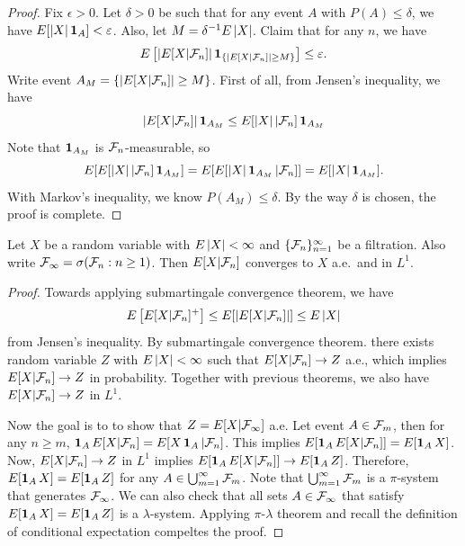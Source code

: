 \documentclass[a4paper]{article}
\begin{document}
\begin{proof}
  Fix $\epsilon > 0$. Let $\delta > 0$ be such that for any event $A$
  with $P(A) \leq \delta$, we have $E [\left\lvert X\right\rvert \operatorname{\mathbf{1}}_A] < \varepsilon$.
  Also, let $M = \delta^{-1} E \left\lvert X\right\rvert$. Claim that for
  any $n$, we have
  \[
    E \left[ \left\lvert E [X | \mathcal{F}_n]\right\rvert \operatorname{\mathbf{1}}_{\{\left\lvert E[X | \mathcal{F}_n]\right\rvert \geq M\}}\right]
    \leq \varepsilon.
  \]
  Write event $A_M = \{\left\lvert E[X | \mathcal{F}_n]\right\rvert \geq M\}$. First of all,
  from Jensen's inequality, we have
  \[
    \left\lvert E [X | \mathcal{F}_n]\right\rvert \operatorname{\mathbf{1}}_{A_M}
    \leq E[\left\lvert X\right\rvert | \mathcal{F}_n] \operatorname{\mathbf{1}}_{A_M}
  \]
  Note that $\operatorname{\mathbf{1}}_{A_M}$ is $\mathcal{F}_n$-measurable, so
  \[
    E[ E[\left\lvert X\right\rvert | \mathcal{F}_n] \operatorname{\mathbf{1}}_{A_M} ]
    = E[ E[\left\lvert X\right\rvert \operatorname{\mathbf{1}}_{A_M} | \mathcal{F}_n] ]
    = E [\left\lvert X\right\rvert \operatorname{\mathbf{1}}_{A_M}].
  \]
  With Markov's inequality, we know $P(A_M) \leq \delta$.
  By the way $\delta$ is chosen, the proof is complete.

\end{proof}

\begin{thm}
  Let $X$ be a random variable with $E \left\lvert X\right\rvert < \infty$ and
  $\{ \mathcal{F}_n \}_{n=1}^\infty$ be a filtration.
  Also write $\mathcal{F}_\infty = \sigma (\mathcal{F}_n : n \geq 1)$.
  Then $E[X | \mathcal{F}_n]$ converges to $X$ a.e.\ and in $L^1$.
\end{thm}

\begin{proof}
  Towards applying submartingale convergence theorem, we have
  \begin{align*}
    E \left[ E[X | \mathcal{F}_n]^+ \right]
    \leq E [ \left\lvert  E[ X | \mathcal{F}_n] \right\rvert ] \leq E \left\lvert X\right\rvert
  \end{align*}
  from Jensen's inequality. By submartingale convergence theorem.
  there exists random variable $Z$ with $E \left\lvert X\right\rvert < \infty$
  such that $E [X | \mathcal{F}_n] \to Z$ a.e., which implies
  $E [X | \mathcal{F}_n] \to Z$ in probability. Together with previous
  theorems, we also have $E [X | \mathcal{F}_n] \to Z$ in $L^1$.

  Now the goal is to to show that $Z = E [X | \mathcal{F}_\infty]$
  a.e. Let event $A \in \mathcal{F}_m$, then for any $n \geq m$,
  $\operatorname{\mathbf{1}}_A E[X | \mathcal{F}_n] = E [X \operatorname{\mathbf{1}}_{A} | \mathcal{F}_n]$.
  This implies $E [\operatorname{\mathbf{1}}_A E [X | \mathcal{F}_n]] = E [\operatorname{\mathbf{1}}_A X]$.
  Now, $E [X | \mathcal{F}_n] \to Z$ in $L^1$ implies
  $E [\operatorname{\mathbf{1}}_A E [X | \mathcal{F}_n]] \to E [\operatorname{\mathbf{1}}_A Z]$. Therefore,
  $E [\operatorname{\mathbf{1}}_A X] = E [\operatorname{\mathbf{1}}_A Z]$ for any $A \in
    \bigcup_{m=1}^\infty \mathcal{F}_m$. Note that $\bigcup_{m=1}^\infty \mathcal{F}_m$ is a $\pi$-system
  that generates $\mathcal{F}_\infty$. We can also check that
  all sets $A \in \mathcal{F}_\infty$ that satisfy
  $E[\operatorname{\mathbf{1}}_A X] = E [\operatorname{\mathbf{1}}_A Z]$ is a $\lambda$-system.
  Applying $\pi$-$\lambda$ theorem and recall the
  definition of conditional expectation compeltes the proof.

\end{proof}
\end{document}
